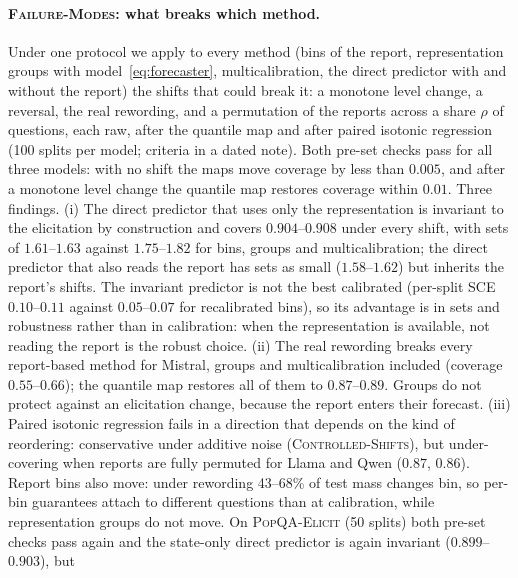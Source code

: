 \documentclass[11pt]{article}
\theoremstyle{definition}
\theoremstyle{remark}
\newcommand{\1}{\mathbf{1}}
\newcommand{\expname}[1]{\textsc{#1}}
\begin{document}
\paragraph{\expname{Failure-Modes}: what breaks which method.} Under one protocol we
apply to every method (bins of the report, representation groups with model~\eqref{eq:forecaster},
multicalibration, the direct predictor with and without the report) the shifts that could break it: a
monotone level change, a reversal, the real rewording, and a permutation of the reports across a share
$\rho$ of questions, each raw, after the quantile map and after paired isotonic regression (100 splits
per model; criteria in a dated note). Both pre-set checks pass for all three models: with no shift the
maps move coverage by less than $0.005$, and after a monotone level change the quantile map restores
coverage within $0.01$. Three findings. (i) The direct predictor that uses only the representation is
invariant to the elicitation by construction and covers $0.904$--$0.908$ under every shift, with sets of
$1.61$--$1.63$ against $1.75$--$1.82$ for bins, groups and multicalibration; the direct predictor that
also reads the report has sets as small ($1.58$--$1.62$) but inherits the report's shifts. The
invariant predictor is not the best calibrated (per-split SCE $0.10$--$0.11$ against $0.05$--$0.07$ for
recalibrated bins), so its advantage is in sets and robustness rather than in calibration: when the
representation is available, not reading the report is the robust choice. (ii) The real rewording
breaks every report-based method for Mistral, groups and multicalibration included (coverage
$0.55$--$0.66$); the quantile map restores all of them to $0.87$--$0.89$. Groups do not protect against
an elicitation change, because the report enters their forecast. (iii) Paired isotonic regression
fails in a direction that depends on the kind of reordering: conservative under additive noise
(\expname{Controlled-Shifts}), but under-covering when reports are fully permuted for Llama and Qwen
($0.87$, $0.86$). Report bins also move: under rewording 43--68\% of test mass changes bin, so per-bin
guarantees attach to different questions than at calibration, while representation groups do not move.
On \expname{PopQA-Elicit} (50 splits) both
pre-set checks pass again and the state-only direct predictor is again invariant ($0.899$--$0.903$), but
\end{document}
